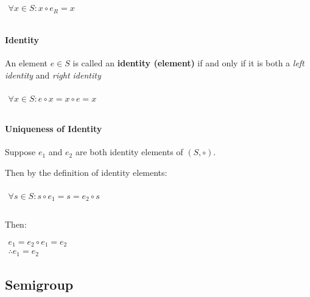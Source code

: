\begin{math}
  \begin{array}{c}
    \\
    \forall x \in S: x \circ e_R = x\\
    \\
  \end{array}
\end{math}


\paragraph{Identity}
An element $e \in S$ is called an \textbf{identity (element)} if and
only if it is both a \textit{left identity} and \textit{right
  identity}

\begin{math}
  \begin{array}{c}
    \\
    \forall x \in S: e \circ x = x \circ e =  x\\
    \\
  \end{array}
\end{math}


\paragraph{Uniqueness of Identity}

Suppose $e_1$ and $e_2$ are both identity elements of $(S, \circ)$.

Then by the definition of identity elements:

\begin{math}
  \begin{array}{c}
    \\
    \forall s \in S: s \circ e_1 = s = e_2 \circ s\\
    \\
  \end{array}
\end{math}

Then:

\begin{math}
  \begin{array}{c}
    e_1 = e_2 \circ e_1 = e_2 \\
    \therefore e_1 = e_2
  \end{array}
\end{math}



\subsection{Semigroup}
\label{sec:semigroup}

